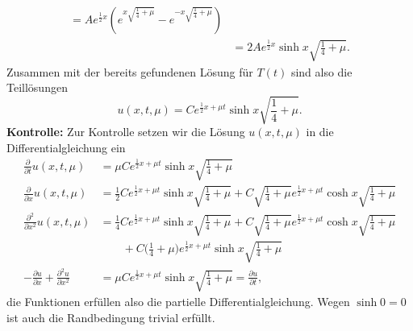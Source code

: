 \begin{loesung}
\begin{teilaufgaben}
\begin{align*}
=Ae^{\frac12x}\left(
e^{x\sqrt{\frac14+\mu}}
-
e^{-x\sqrt{\frac14+\mu}}
\right)
\\
&=2Ae^{\frac12x}\sinh x\sqrt{\frac14+\mu}.
\end{align*}
Zusammen mit der bereits gefundenen Lösung für $T(t)$ sind also
die Teillösungen
\[
u(x,t,\mu)=
Ce^{\frac12x+\mu t}\sinh x\sqrt{\frac14+\mu}.
\]
{\bf Kontrolle:} Zur Kontrolle setzen wir die Lösung $u(x,t,\mu)$
in die Differentialgleichung ein
\begin{align*}
\frac{\partial}{\partial t}u(x,t,\mu)&=
\mu Ce^{\frac12x+\mu t}\sinh x\sqrt{\frac14+\mu}
\\
\frac{\partial}{\partial x}u(x,t,\mu)&=
\frac12
Ce^{\frac12x+\mu t}\sinh x\sqrt{\frac14+\mu}
+
C\sqrt{\frac14+\mu}e^{\frac12x+\mu t}\cosh x\sqrt{\frac14+\mu}
\\
\frac{\partial^2}{\partial x^2}u(x,t,\mu)&=
\frac14
Ce^{\frac12x+\mu t}\sinh x\sqrt{\frac14+\mu}
+
C\sqrt{\frac14+\mu}e^{\frac12x+\mu t}\cosh x\sqrt{\frac14+\mu}
\\
&\qquad +
C\biggl(\frac14+\mu\biggr)e^{\frac12x+\mu t}\sinh x\sqrt{\frac14+\mu}
\\
-\frac{\partial u}{\partial x}
+
\frac{\partial^2 u}{\partial x^2}
&=
\mu Ce^{\frac12x+\mu t}\sinh x\sqrt{\frac14+\mu}
=
\frac{\partial u}{\partial t},
\end{align*}
die Funktionen erfüllen also die partielle Differentialgleichung.
Wegen $\sinh 0=0$ ist auch die Randbedingung trivial erfüllt.
\qedhere
\end{teilaufgaben}
\end{loesung}
